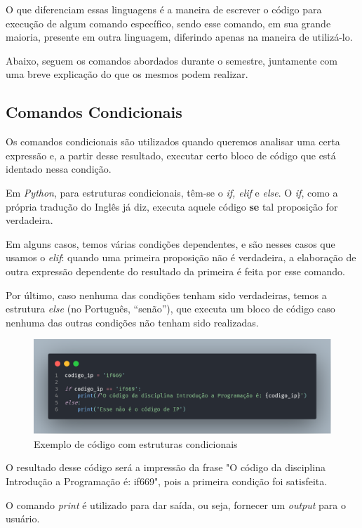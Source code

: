 \documentclass[a4paper, 12pt]{article}
\begin{document}
O que diferenciam essas linguagens é a maneira de escrever o código para execução de algum comando específico, sendo esse comando, em sua grande maioria, presente em outra linguagem, diferindo apenas na maneira de utilizá-lo.

Abaixo, seguem os comandos abordados durante o semestre, juntamente com uma breve explicação do que os mesmos podem realizar.

\subsection{Comandos Condicionais}
Os comandos condicionais são utilizados quando queremos analisar uma certa expressão e, a partir desse resultado, executar certo bloco de código que está identado nessa condição.

Em \textit{Python}, para estruturas condicionais, têm-se o \textit{if, elif} e \textit{else}. O \textit{if}, como a própria tradução do Inglês já diz, executa aquele código \textbf{se} tal proposição for verdadeira. 

Em alguns casos, temos várias condições dependentes, e são nesses casos que usamos o \textit{elif}: quando uma primeira proposição não é verdadeira, a elaboração de outra expressão dependente do resultado da primeira é feita por esse comando. 

Por último, caso nenhuma das condições tenham sido verdadeiras, temos a estrutura \textit{else} (no Português, “senão”), que executa um bloco de código caso nenhuma das outras condições não tenham sido realizadas. 

\begin{figure}[ht]
    \centering
    \includegraphics[width = 12cm]{imagens/if.png}
    \caption{Exemplo de código com estruturas condicionais \cite{codes}}
    \label{If's}
\end{figure}
O resultado desse código será a impressão da frase "O código da disciplina Introdução a Programação é: if669", pois a primeira condição foi satisfeita. 

O comando \textit{print} é utilizado para dar saída, ou seja, fornecer um \textit{output} para o usuário.
\end{document}
